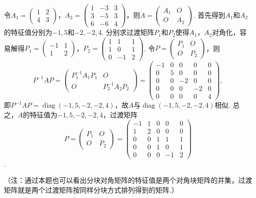 \documentclass[UTF8,12pt,a4paper,fontset=fandol]{ctexart}
\begin{document}
\begin{solve}
令$A_1=\begin{pmatrix}
                1 & 2 \\ 4 & 3
            \end{pmatrix}$，$A_2=\begin{pmatrix}
                1 & -3 & 3 \\ 3 & -5 & 3 \\ 6 & -6 & 4
            \end{pmatrix}$，则$A=\begin{pmatrix}
                A_1 & O \\ O & A_2
            \end{pmatrix}$. 首先得到$A_1$和$A_2$的特征值分别为$-1,5$和$-2,-2,4$. 分别求过渡矩阵$P_1$和$P_2$使得$A_1$，$A_2$对角化，容易解得$P_1=\begin{pmatrix}
                -1 & 1 \\ 1 & 2
            \end{pmatrix}$，$P_2=\begin{pmatrix}
                1 & 1 & 1 \\ 1 & 0 & 1 \\ 0 & -1 & 2
            \end{pmatrix}$. 令$P=\begin{pmatrix}
                P_1 & O \\ O & P_2
            \end{pmatrix}$，则
        \[P^{-1}AP=\begin{pmatrix}
                P_1^{-1}A_1P_1 & O \\ O & P_2^{-1}A_2P_2
            \end{pmatrix}=\begin{pmatrix}
                -1 & 0 & 0 & 0 & 0 \\ 0 & 5 & 0 & 0 & 0 \\ 0 & 0 & -2 & 0 & 0 \\ 0 & 0 & 0 & -2 & 0 \\ 0 & 0 & 0 & 0 & 4
            \end{pmatrix},\]
        即$P^{-1}AP=\operatorname{diag}(-1,5,-2,-2,4)$，故$A$与$\operatorname{diag}(-1,5,-2,-2,4)$相似. 总之，$A$的特征值为$-1,5,-2,-2,4$，过渡矩阵
\[P=\begin{pmatrix}
                P_1 & O \\ O & P_2
            \end{pmatrix}=\begin{pmatrix}
                -1 & 1 & 0 & 0 & 0 \\ 1 & 2 & 0 & 0 & 0 \\ 0 & 0 & 1 & 1 & 1 \\ 0 & 0 & 1 & 0 & 1 \\ 0 & 0 & 0 & -1 & 2
            \end{pmatrix}\]
.

        （注：通过本题也可以看出分块对角矩阵的特征值是两个对角块矩阵的并集，过渡矩阵就是两个过渡矩阵按同样分块方式排列得到的矩阵.）
\end{solve}
\end{document}
